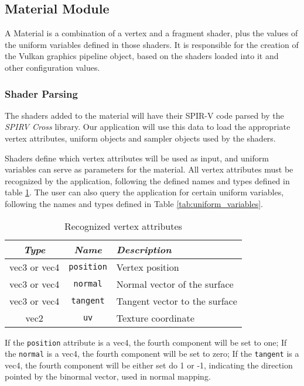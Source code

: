 \subsection{Material Module}
A Material is a combination of a vertex and a fragment shader, plus the values of the uniform variables defined in those shaders. It is responsible for the creation of the Vulkan graphics pipeline object, based on the shaders loaded into it and other configuration values.

\subsubsection{Shader Parsing}
The shaders added to the material will have their SPIR-V code parsed by the \emph{SPIRV Cross} library. Our application will use this data to load the appropriate vertex attributes, uniform objects and sampler objects used by the shaders.

Shaders define which vertex attributes will be used as input, and uniform variables can serve as parameters for the material. All vertex attributes must be recognized by the application, following the defined names and types defined in table \ref{tab:vertex_attributes}. The user can also query the application for certain uniform variables, following the names and types defined in Table \ref{tab:uniform_variables}.

\begin{table}[h]
    \centering
    \caption{Recognized vertex attributes}
    \begin{tabular}{|c|c|p{6cm}|}
    \hline
        \textit{Type} & \textit{Name} & \textit{Description} \\
        \hline \hline
        vec3 or vec4 & \texttt{position} & Vertex position \\
        vec3 or vec4 & \texttt{normal} & Normal vector of the surface \\
        vec3 or vec4 & \texttt{tangent} & Tangent vector to the surface \\
        vec2 & \texttt{uv} & Texture coordinate \\
        \hline
    \end{tabular}
    \label{tab:vertex_attributes}
\end{table}

If the \texttt{position} attribute is a vec4, the fourth component will be set to one; If the \texttt{normal} is a vec4, the fourth component will be set to zero; If the \texttt{tangent} is a vec4, the fourth component will be either set do 1 or -1, indicating the direction pointed by the binormal vector, used in normal mapping.

